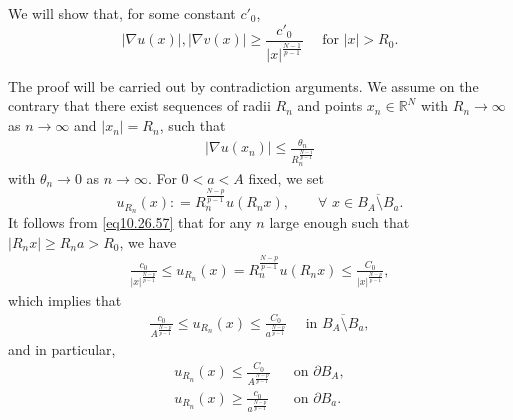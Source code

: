 \documentclass[12pt]{amsart}
\theoremstyle{definition}
\theoremstyle{remark}
\theoremstyle{conclusion}
\theoremstyle{conjecture}
\numberwithin{equation}{section}
\newcommand{\R}{\mathbb{R}}
\begin{document}
\smallskip

We will show that, for some constant $c'_0$,
$$ |\nabla u(x)|, |\nabla v(x)| \geq \frac{c'_0}{|x|^\frac{N-1}{p-1}} \quad\,\,\mbox{for}\,\,|x|>R_0.$$

The proof will be carried out by contradiction arguments. We assume on the contrary that there exist sequences of radii $R_n$ and points $x_n\in\R^N$ with $R_n\to\infty$ as $n\to\infty$ and $|x_n|=R_n$, such that
\begin{align}\label{eq2908}
|\nabla u(x_n)|\leq \frac{\theta_n}{R_n^\frac{N-1}{p-1}}
\end{align}
with $\theta_n\to 0$ as $n\to\infty$. For $0<a<A$ fixed, we set
$$ u_{R_n} (x): =R_n^\frac{N-p}{p-1}   u(R_n  x), \qquad \forall \,\, x\in\overline{B_A \setminus B_a}.$$
It follows from \eqref{eq10.26.57} that for any $n$ large enough such that $|R_n x|\geq R_{n}a>R_0$, we have
\begin{align}\label{eq2910}
\frac{c_0}{|x|^\frac{N-p}{p-1}}   \leq    u_{R_n} (x)=R_n^\frac{N-p}{p-1} u(R_n  x) \leq \frac{C_0}{|x|^\frac{N-p}{p-1}},%
\end{align}
which implies that
\begin{align}\label{eq2911}
\frac{c_0}{A^\frac{N-p}{p-1}}   \leq    u_{R_n} (x) \leq \frac{C_0}{a^\frac{N-p}{p-1}}\,\,\,\,\,\,\,\,\mbox{in}\,\,\overline{B_A \setminus B_a},
\end{align}
and in particular,
\begin{align}\label{eq2912}
u_{R_n} (x) \leq \frac{C_0}{A^\frac{N-p}{p-1}}\,\,\,\,\,&\mbox{on}\,\,\partial B_A, \\
u_{R_n} (x) \geq \frac{c_0}{a^\frac{N-p}{p-1}}\,\,\,\,\,&\mbox{on}\,\,\partial B_a. \nonumber
\end{align}
\end{document}

